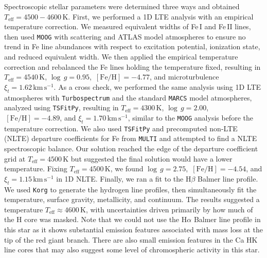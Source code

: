 \documentclass{natureprintstyle}
\newcommand{\code}[1]{\texttt{#1}\xspace}
\newcommand{\unit}[1]{\ensuremath{\mathrm{\,#1}}\xspace}
\newcommand{\feh}{\unit{[Fe/H]}}
\newcommand{\teff}{\ensuremath{T_\mathrm{eff}}\xspace}
\newcommand{\Teff}{\teff}
\newcommand{\logg}{\ensuremath{\log\,g}\xspace}
\newcommand{\kms}{\unit{km\,s^{-1}}}
\begin{document}
Spectroscopic stellar parameters were determined three ways and obtained $\Teff = 4500-4600$\,K.
First, we performed a 1D LTE analysis with an empirical temperature correction\cite{Frebel2013}.
We measured equivalent widths of Fe\,I and Fe\,II lines, then used \code{MOOG} with scattering\cite{Sneden1973,Sobeck2011,Sneden2012} and ATLAS model atmospheres\cite{Kurucz1979,Castelli2003} to ensure no trend in Fe line abundances with respect to excitation potential, ionization state, and reduced equivalent width.
We then applied the empirical temperature correction and rebalanced the Fe lines holding the temperature fixed, resulting in $\Teff=4540$\,K, $\logg=0.95$, $\feh=-4.77$, and microturbulence $\xi_t = 1.62\kms$.
As a cross check, we performed the same analysis using 1D LTE atmospheres with \code{Turbospectrum}{\cite{Plez2012}} and the standard \code{MARCS} model atmospheres\cite{Gustafsson2008}, analyzed using \code{TSFitPy}{\cite{Gerber2023}}, resulting in $\Teff=4300$\,K, $\logg=2.00$, $\feh=-4.89$, and $\xi_t=1.70\kms$, similar to the \code{MOOG} analysis before the temperature correction.
We also used \code{TSFitPy} and precomputed non-LTE (NLTE) departure coefficients for Fe\cite{Bergemann2012b} from \code{MULTI}\cite{Carlsson1986} and attempted to find a NLTE spectroscopic balance. Our solution reached the edge of the departure coefficient grid at $\Teff = 4500$\,K but suggested the final solution would have a lower temperature. Fixing $\Teff=4500$\,K, we found $\logg=2.75$, $\feh=-4.54$, and $\xi_t=1.15\kms$ in 1D NLTE.
Finally, we ran a fit to the H$\beta$ Balmer line profile. We used \code{Korg}\cite{Wheeler2023,Wheeler2024} to generate the hydrogen line profiles, then simultaneously fit the temperature, surface gravity, metallicity, and continuum\cite{Casey2017}.
The results suggested a temperature $\Teff \approx 4600$\,K, with uncertainties driven primarily by how much of the H core was masked.
Note that we could not use the H$\alpha$ Balmer line profile in this star as it shows substantial emission features associated with mass loss at the tip of the red giant branch.
There are also small emission features in the Ca HK line cores that may also suggest some level of chromospheric activity in this star.
\end{document}

